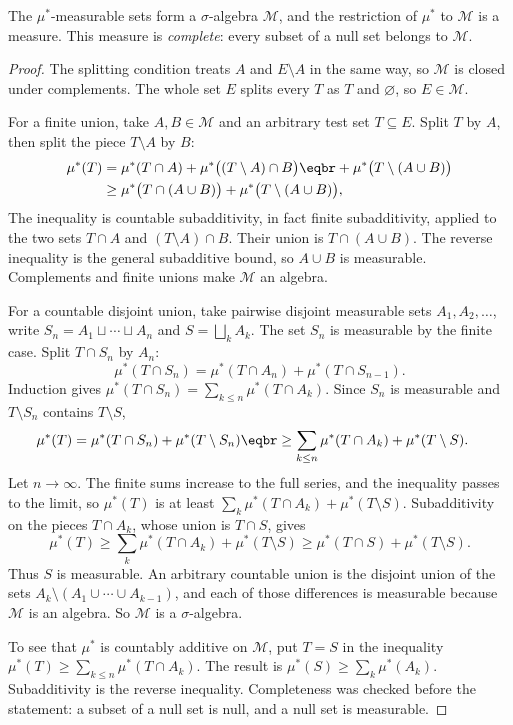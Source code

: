 \begin{theorem}\label{thm:caratheodory}
The $\mu^*$-measurable sets form a $\sigma$-algebra $\mathcal M$, and the restriction of $\mu^*$ to $\mathcal M$ is a measure.
This measure is \emph{complete}: every subset of a null set belongs to $\mathcal M$.
\end{theorem}
\begin{proof}
The splitting condition treats $A$ and $E\setminus A$ in the same way, so $\mathcal M$ is closed under complements.
The whole set $E$ splits every $T$ as $T$ and $\varnothing$, so $E\in\mathcal M$.

For a finite union, take $A,B\in\mathcal M$ and an arbitrary test set $T\subseteq E$.
Split $T$ by $A$, then split the piece $T\setminus A$ by $B$:
\[\begin{aligned}\mu^*(T)&=\mu^*(T\cap A)+\mu^*\bigl((T\setminus A)\cap B\bigr)\eqbr+\mu^*\bigl(T\setminus(A\cup B)\bigr)\\&\ge\mu^*\bigl(T\cap(A\cup B)\bigr)+\mu^*\bigl(T\setminus(A\cup B)\bigr),\end{aligned}\]
The inequality is countable subadditivity, in fact finite subadditivity, applied to the two sets $T\cap A$ and $(T\setminus A)\cap B$.
Their union is $T\cap(A\cup B)$.
The reverse inequality is the general subadditive bound, so $A\cup B$ is measurable.
Complements and finite unions make $\mathcal M$ an algebra.

For a countable disjoint union, take pairwise disjoint measurable sets $A_1,A_2,\ldots$, write $S_n=A_1\sqcup\cdots\sqcup A_n$ and $S=\bigsqcup_k A_k$.
The set $S_n$ is measurable by the finite case.
Split $T\cap S_n$ by $A_n$:
\[
\mu^*(T\cap S_n)=\mu^*(T\cap A_n)+\mu^*(T\cap S_{n-1}).
\]
Induction gives $\mu^*(T\cap S_n)=\sum_{k\le n}\mu^*(T\cap A_k)$.
Since $S_n$ is measurable and $T\setminus S_n$ contains $T\setminus S$,
\[\begin{aligned}\mu^*(T)&=\mu^*(T\cap S_n)+\mu^*(T\setminus S_n)\eqbr\ge\sum_{k\le n}\mu^*(T\cap A_k)+\mu^*(T\setminus S).\end{aligned}\]
Let $n\to\infty$.
The finite sums increase to the full series, and the inequality passes to the limit, so $\mu^*(T)$ is at least $\sum_k\mu^*(T\cap A_k)+\mu^*(T\setminus S)$.
Subadditivity on the pieces $T\cap A_k$, whose union is $T\cap S$, gives
\[
\mu^*(T)\ge\sum_k\mu^*(T\cap A_k)+\mu^*(T\setminus S)\ge\mu^*(T\cap S)+\mu^*(T\setminus S).
\]
Thus $S$ is measurable.
An arbitrary countable union is the disjoint union of the sets $A_k\setminus(A_1\cup\cdots\cup A_{k-1})$, and each of those differences is measurable because $\mathcal M$ is an algebra.
So $\mathcal M$ is a $\sigma$-algebra.

To see that $\mu^*$ is countably additive on $\mathcal M$, put $T=S$ in the inequality $\mu^*(T)\ge\sum_{k\le n}\mu^*(T\cap A_k)$.
The result is $\mu^*(S)\ge\sum_k\mu^*(A_k)$.
Subadditivity is the reverse inequality.
Completeness was checked before the statement: a subset of a null set is null, and a null set is measurable.
\end{proof}

